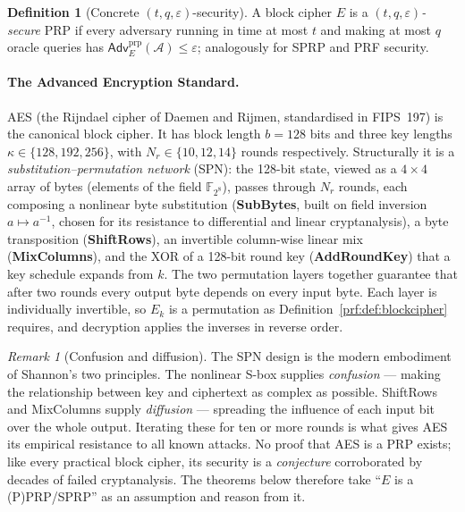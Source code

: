 \documentclass[11pt,a4paper]{article}
\theoremstyle{definition}
\newtheorem{definition}[theorem]{Definition}
\theoremstyle{remark}
\newtheorem{remark}[theorem]{Remark}
\newcommand{\F}{\ensuremath{\mathbb{F}}}
\begin{document}
\begin{definition}[Concrete \((t,q,\varepsilon)\)-security]\label{prf:def:concrete}
A block cipher \(E\) is a \emph{\((t, q, \varepsilon)\)-secure} PRP if every adversary running in time at most \(t\) and making at most \(q\) oracle queries has \(\mathsf{Adv}^{\mathrm{prp}}_{E}(\mathcal{A}) \le \varepsilon\); analogously for SPRP and PRF security.
\end{definition}

\paragraph{The Advanced Encryption Standard.} AES (the Rijndael cipher of Daemen and Rijmen, standardised in FIPS~197) is the canonical block cipher. It has block length \(b = 128\) bits and three key lengths \(\kappa \in \{128, 192, 256\}\), with \(N_r \in \{10, 12, 14\}\) rounds respectively. Structurally it is a \emph{substitution--permutation network} (SPN): the 128-bit state, viewed as a \(4 \times 4\) array of bytes (elements of the field \(\F_{2^8}\)), passes through \(N_r\) rounds, each composing a nonlinear byte substitution (\textbf{SubBytes}, built on field inversion \(a \mapsto a^{-1}\), chosen for its resistance to differential and linear cryptanalysis), a byte transposition (\textbf{ShiftRows}), an invertible column-wise linear mix (\textbf{MixColumns}), and the XOR of a 128-bit round key (\textbf{AddRoundKey}) that a key schedule expands from \(k\). The two permutation layers together guarantee that after two rounds every output byte depends on every input byte. Each layer is individually invertible, so \(E_k\) is a permutation as Definition~\ref{prf:def:blockcipher} requires, and decryption applies the inverses in reverse order.

\begin{remark}[Confusion and diffusion]\label{prf:rem:confusiondiffusion}
The SPN design is the modern embodiment of Shannon's two principles. The nonlinear S-box supplies \emph{confusion} --- making the relationship between key and ciphertext as complex as possible. ShiftRows and MixColumns supply \emph{diffusion} --- spreading the influence of each input bit over the whole output. Iterating these for ten or more rounds is what gives AES its empirical resistance to all known attacks. No proof that AES is a PRP exists; like every practical block cipher, its security is a \emph{conjecture} corroborated by decades of failed cryptanalysis. The theorems below therefore take ``\(E\) is a (P)PRP/SPRP'' as an assumption and reason from it.
\end{remark}
\end{document}
